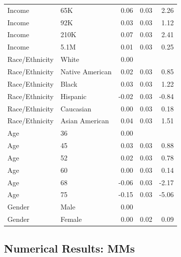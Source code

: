 \documentclass[a4paper,12pt]{article}\usepackage[]{graphicx}\usepackage[]{color}
\begin{document}
\begin{table}[ht]
\begin{tabular}{lp{3in}rrr}
  Income & 65K & 0.06 & 0.03 & 2.26 \\ 
  Income & 92K & 0.03 & 0.03 & 1.12 \\ 
  Income & 210K & 0.07 & 0.03 & 2.41 \\ 
  Income & 5.1M & 0.01 & 0.03 & 0.25 \\ 
  Race/Ethnicity & White & 0.00 &  &  \\ 
  Race/Ethnicity & Native American & 0.02 & 0.03 & 0.85 \\ 
  Race/Ethnicity & Black & 0.03 & 0.03 & 1.22 \\ 
  Race/Ethnicity & Hispanic & -0.02 & 0.03 & -0.84 \\ 
  Race/Ethnicity & Caucasian & 0.00 & 0.03 & 0.18 \\ 
  Race/Ethnicity & Asian American & 0.04 & 0.03 & 1.51 \\ 
  Age & 36 & 0.00 &  &  \\ 
  Age & 45 & 0.03 & 0.03 & 0.88 \\ 
  Age & 52 & 0.02 & 0.03 & 0.78 \\ 
  Age & 60 & 0.00 & 0.03 & 0.14 \\ 
  Age & 68 & -0.06 & 0.03 & -2.17 \\ 
  Age & 75 & -0.15 & 0.03 & -5.06 \\ 
  Gender & Male & 0.00 &  &  \\ 
  Gender & Female & 0.00 & 0.02 & 0.09 \\ 
   \hline
\end{tabular}
\endgroup
\end{table}


\clearpage

\subsection{Numerical Results: MMs}
\end{document}
